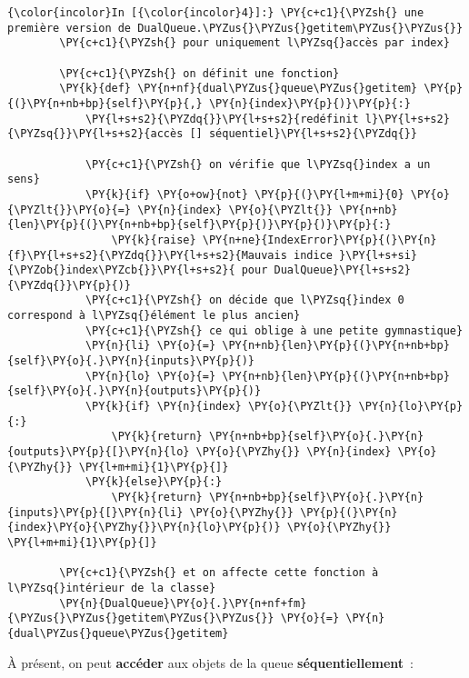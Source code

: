     \begin{Verbatim}[commandchars=\\\{\},frame=single,framerule=0.3mm,rulecolor=\color{cellframecolor}]
{\color{incolor}In [{\color{incolor}4}]:} \PY{c+c1}{\PYZsh{} une première version de DualQueue.\PYZus{}\PYZus{}getitem\PYZus{}\PYZus{}}
        \PY{c+c1}{\PYZsh{} pour uniquement l\PYZsq{}accès par index}
        
        \PY{c+c1}{\PYZsh{} on définit une fonction}
        \PY{k}{def} \PY{n+nf}{dual\PYZus{}queue\PYZus{}getitem} \PY{p}{(}\PY{n+nb+bp}{self}\PY{p}{,} \PY{n}{index}\PY{p}{)}\PY{p}{:}
            \PY{l+s+s2}{\PYZdq{}}\PY{l+s+s2}{redéfinit l}\PY{l+s+s2}{\PYZsq{}}\PY{l+s+s2}{accès [] séquentiel}\PY{l+s+s2}{\PYZdq{}}
        
            \PY{c+c1}{\PYZsh{} on vérifie que l\PYZsq{}index a un sens}
            \PY{k}{if} \PY{o+ow}{not} \PY{p}{(}\PY{l+m+mi}{0} \PY{o}{\PYZlt{}}\PY{o}{=} \PY{n}{index} \PY{o}{\PYZlt{}} \PY{n+nb}{len}\PY{p}{(}\PY{n+nb+bp}{self}\PY{p}{)}\PY{p}{)}\PY{p}{:}
                \PY{k}{raise} \PY{n+ne}{IndexError}\PY{p}{(}\PY{n}{f}\PY{l+s+s2}{\PYZdq{}}\PY{l+s+s2}{Mauvais indice }\PY{l+s+si}{\PYZob{}index\PYZcb{}}\PY{l+s+s2}{ pour DualQueue}\PY{l+s+s2}{\PYZdq{}}\PY{p}{)}
            \PY{c+c1}{\PYZsh{} on décide que l\PYZsq{}index 0 correspond à l\PYZsq{}élément le plus ancien}
            \PY{c+c1}{\PYZsh{} ce qui oblige à une petite gymnastique}
            \PY{n}{li} \PY{o}{=} \PY{n+nb}{len}\PY{p}{(}\PY{n+nb+bp}{self}\PY{o}{.}\PY{n}{inputs}\PY{p}{)}
            \PY{n}{lo} \PY{o}{=} \PY{n+nb}{len}\PY{p}{(}\PY{n+nb+bp}{self}\PY{o}{.}\PY{n}{outputs}\PY{p}{)}
            \PY{k}{if} \PY{n}{index} \PY{o}{\PYZlt{}} \PY{n}{lo}\PY{p}{:}
                \PY{k}{return} \PY{n+nb+bp}{self}\PY{o}{.}\PY{n}{outputs}\PY{p}{[}\PY{n}{lo} \PY{o}{\PYZhy{}} \PY{n}{index} \PY{o}{\PYZhy{}} \PY{l+m+mi}{1}\PY{p}{]}
            \PY{k}{else}\PY{p}{:}
                \PY{k}{return} \PY{n+nb+bp}{self}\PY{o}{.}\PY{n}{inputs}\PY{p}{[}\PY{n}{li} \PY{o}{\PYZhy{}} \PY{p}{(}\PY{n}{index}\PY{o}{\PYZhy{}}\PY{n}{lo}\PY{p}{)} \PY{o}{\PYZhy{}} \PY{l+m+mi}{1}\PY{p}{]}
        
        \PY{c+c1}{\PYZsh{} et on affecte cette fonction à l\PYZsq{}intérieur de la classe}
        \PY{n}{DualQueue}\PY{o}{.}\PY{n+nf+fm}{\PYZus{}\PYZus{}getitem\PYZus{}\PYZus{}} \PY{o}{=} \PY{n}{dual\PYZus{}queue\PYZus{}getitem}
\end{Verbatim}


    À présent, on peut \textbf{accéder} aux objets de la queue
\textbf{séquentiellement}~:

